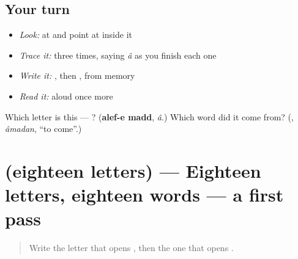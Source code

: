 \subsection*{Your turn}
\begin{itemize}
\raggedright
  \item \emph{Look:} at \textbf{} and point at  inside it
  \item \emph{Trace it:}  three times, saying \emph{â} as you finish each one
  \item \emph{Write it:} , then , from memory
  \item \emph{Read it:} \textbf{} aloud once more
\end{itemize}

\begin{tcolorbox}[breakable,colback=teal!4,colframe=teal!35!black,title={Before you move on}]
Which letter is this — ? (\textbf{alef-e madd}, \emph{â}.) Which word did it come from? (\textbf{}, \emph{âmadan}, \textquotedblleft{}to come\textquotedblright{}.)
\end{tcolorbox}
\section[(eighteen letters)]{(eighteen letters) — Eighteen letters, eighteen words — a first pass}

\label{lesson:FA-R26-letters-first-pass}



\begin{quote}
Write the letter that opens , then the one that opens .
\end{quote}

